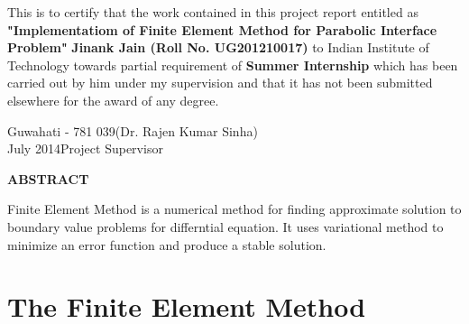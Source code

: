 \documentclass{report}
\numberwithin{equation}{chapter}
\begin{document}
 \begin{flushleft}
 This is to certify that the work contained in this project report entitled as \textbf{"Implementatiom of Finite Element Method for Parabolic Interface Problem"} \textbf{Jinank Jain (Roll No. UG201210017)} to Indian Institute of Technology towards partial requirement of \textbf{Summer Internship} which has been carried out by him under my supervision and that it has not been submitted elsewhere for the award of any degree.\\
 \end{flushleft}
 \bigskip \bigskip \bigskip \bigskip \bigskip
 
\noindent Guwahati - 781 039\hfill \hfill (Dr. Rajen Kumar Sinha)\\
\noindent July 2014\hfill \hfill Project Supervisor\\

\newpage
\begin{center}
 {\textbf{ \Large ABSTRACT\\ \bigskip}}
\end{center}
\begin{flushleft}
Finite Element Method is a numerical method for finding approximate solution to boundary value problems for differntial equation. It uses variational method to minimize an error function and produce a stable solution.
\end{flushleft}


\tableofcontents
\chapter{The Finite Element Method}
\end{document}
